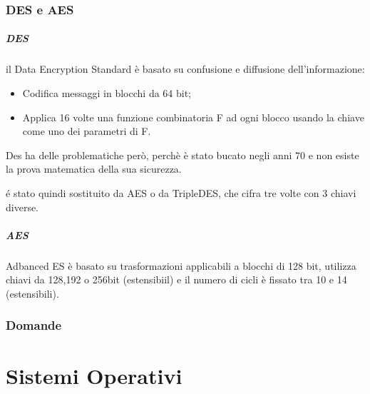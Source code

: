 \documentclass[12pt, a4paper, openany]{book}
\begin{document}
\subsection{DES e AES}
\paragraph*{DES} il Data Encryption Standard è basato su confusione e diffusione dell'informazione:
\begin{itemize}
    \item Codifica messaggi in blocchi da 64 bit;
    \item Applica 16 volte una funzione combinatoria F ad ogni blocco usando la chiave come uno dei parametri di F.
\end{itemize}
Des ha delle problematiche però, perchè è stato bucato negli anni 70 e non esiste la prova matematica della sua sicurezza.

é stato quindi sostituito da AES o da TripleDES, che cifra tre volte con 3 chiavi diverse.

\paragraph*{AES}
Adbanced ES è basato su trasformazioni applicabili a blocchi di 128 bit, utilizza chiavi da 128,192 o 256bit (estensibiil) e il numero di cicli è fissato tra 10 e 14 (estensibili).

\subsection{Domande}


\chapter{Sistemi Operativi}
\end{document}
